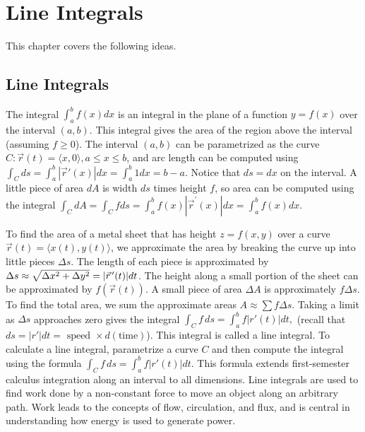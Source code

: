 
\chapter{Line Integrals}

This chapter covers the following ideas. 


\section{Line Integrals}

The integral $\int_a^b f(x)dx$ is an integral in the plane of a function
$y=f(x)$ over the interval $(a,b)$.  This integral gives the area of
the region above the interval (assuming $f\geq 0$).  The interval $(a,b)$
can be parametrized as the curve $C\colon\vec r(t)= \langle x,0\rangle, a\leq x\leq
b$, and arc length can be computed using $\int_C ds = \int_a^b |\vec
r'(x)|dx = \int_a^b 1 dx = b-a$. Notice that $ds=dx$ on the interval. A
little piece of area $dA$ is width $ds$ times height $f$, so area can
be computed using the integral $\int_C dA = \int_C f ds = \int_a^b f(x)|\vec
r^\prime(x)|dx = \int_a^b f(x) dx$. 

To find the area of a metal sheet that has height $z=f(x,y) $ over a
curve $ \vec r(t)=\langle x(t),y(t)\rangle $, we approximate the area by breaking
the curve up into little pieces $\Delta s$. The length of each piece is
approximated by {$ \Delta s \approx \sqrt{\Delta x^2 +\Delta y^2} =|\vec r^{\,\prime}(t)|dt$}. The
height along a small portion of the sheet can be approximated by
$f(\vec r(t))$. A small piece of area $\Delta A$ is approximately $f\Delta s
$. To find the total area, we sum the approximate areas $A\approx \sum f\Delta s$.
Taking a limit as $\Delta s$ approaches zero gives the integral $ \int_C f \,ds
= \int_a^b f |r'(t)|dt,$ (recall that $ds = |r'| dt = \text{ speed } \times
d(\text{time})$).  This integral is called a line integral.  To
calculate a line integral, parametrize a curve $C$ and then compute
the integral using the formula $ \int_C f\,ds = \int_a^b f |r'(t)|dt $. This
formula extends first-semester calculus integration along an interval
to all dimensions.  Line integrals are used to find work done by a
non-constant force to move an object along an arbitrary path. Work
leads to the concepts of flow, circulation, and flux, and is central
in understanding how energy is used to generate power.

